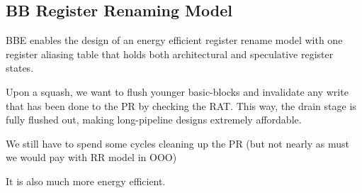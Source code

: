 \subsection{BB Register Renaming Model}
\label{sec:bb_reg_ren}

BBE enables the design of an energy efficient register rename model with one
register aliasing table that holds both architectural and speculative register
states.

Upon a squash, we want to flush younger basic-blocks and invalidate any write
that has been done to the PR by checking the RAT. This way, the drain stage is
fully flushed out, making long-pipeline designs extremely affordable.

We still have to spend some cycles cleaning up the PR (but not nearly as must we
        would pay with RR model in OOO)

It is also much more energy efficient.

